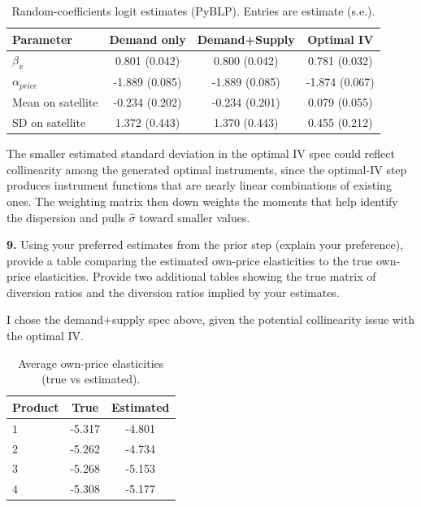 \documentclass{article}
\begin{document}
\begin{table}[H]
\centering
\caption{Random-coefficients logit estimates (PyBLP). Entries are estimate (s.e.).}
\begin{tabular}{lccc}
\hline
Parameter & Demand only & Demand+Supply & Optimal IV\\
\hline
$\beta_x$ & 0.801 (0.042) & 0.800 (0.042) & 0.781 (0.032)\\
$\alpha_{price}$ & -1.889 (0.085) & -1.889 (0.085) & -1.874 (0.067)\\
Mean on satellite & -0.234 (0.202) & -0.234 (0.201) & 0.079 (0.055)\\
SD on satellite & 1.372 (0.443) & 1.370 (0.443) & 0.455 (0.212)\\
\hline
\end{tabular}
\end{table}



The smaller estimated standard deviation in the optimal IV spec could reflect collinearity among the generated optimal instruments, since the optimal-IV step produces instrument functions that are nearly linear combinations of existing ones. The weighting matrix then down weights the moments that help identify the dispersion and pulls $\hat{\sigma}$ toward smaller values.





\begin{tcolorbox}
\textbf{9.} Using your preferred estimates from the prior step (explain your
preference), provide a table comparing the estimated own-price elasticities
to the true own-price elasticities. Provide two additional tables showing
the true matrix of diversion ratios and the diversion ratios implied by your
estimates.
\end{tcolorbox}

I chose the demand+supply spec above, given the potential collinearity issue with the optimal IV. 

\begin{table}[H]
\centering
\caption{Average own-price elasticities (true vs estimated).}
\begin{tabular}{lcc}
\hline
Product & True & Estimated\\
\hline
$1$ & -5.317 & -4.801\\
$2$ & -5.262 & -4.734\\
$3$ & -5.268 & -5.153\\
$4$ & -5.308 & -5.177\\
\hline\end{tabular}\end{table}
\end{document}
